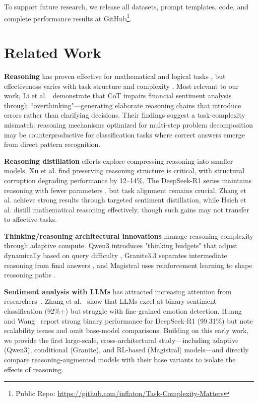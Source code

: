\documentclass[runningheads]{llncs}
\begin{document}
To support future research, we release all datasets, prompt templates, code, and complete performance results at GitHub\footnote{Public Repo: \url{https://github.com/inflaton/Task-Complexity-Matters}}.

\section{Related Work}

\textbf{Reasoning} has proven effective for mathematical and logical tasks \cite{wei2022chain}, but effectiveness varies with task structure and complexity \cite{prabhakar2024factors}. Most relevant to our work, Li et al.~\cite{li2025financial} demonstrate that CoT impairs financial sentiment analysis through ``overthinking"—generating elaborate reasoning chains that introduce errors rather than clarifying decisions. Their findings suggest a task-complexity mismatch: reasoning mechanisms optimized for multi-step problem decomposition may be counterproductive for classification tasks where correct answers emerge from direct pattern recognition.

\textbf{Reasoning distillation} efforts explore compressing reasoning into smaller models. Xu et al. \cite{xu2024survey} find preserving reasoning structure is critical, with structural corruption degrading performance by 12--14\%. The DeepSeek-R1 series maintains reasoning with fewer parameters \cite{deepseek2025r1}, but task alignment remains crucial. Zhang et al. \cite{zhang2025targeted} achieve strong results through targeted sentiment distillation, while Hsieh et al. \cite{hsieh2023distilling} distill mathematical reasoning effectively, though such gains may not transfer to affective tasks.

\textbf{Thinking/reasoning architectural innovations} manage reasoning complexity through adaptive compute. Qwen3 introduces "thinking budgets" that adjust dynamically based on query difficulty \cite{qwen2025technical}, Granite3.3 separates intermediate reasoning from final answers \cite{ibm2025granite}, and Magistral uses reinforcement learning to shape reasoning paths \cite{rastogi2025magistral}.

\textbf{Sentiment analysis with LLMs} has attracted increasing attention from researchers~\cite{wang2025review}.
Zhang et al.~\cite{zhang2024sentiment} show that LLMs excel at binary sentiment classification (92\%+) but struggle with fine-grained emotion detection.
Huang and Wang~\cite{huang2025explainable} report strong binary performance for DeepSeek-R1 (99.31\%) but note scalability issues and omit base-model comparisons.
Building on this early work, we provide the first large-scale, cross-architectural study—including adaptive (Qwen3), conditional (Granite), and RL-based (Magistral) models—and directly compare reasoning-augmented models with their base variants to isolate the effects of reasoning.
\end{document}
